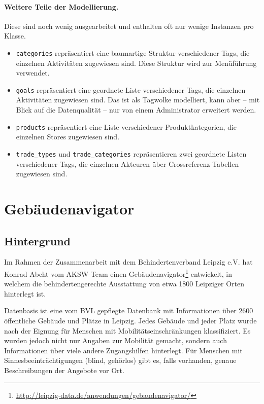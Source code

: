 \documentclass[a4paper,11pt]{article}
\begin{document}
\paragraph{Weitere Teile der Modellierung.}
Diese sind noch wenig ausgearbeitet und enthalten oft nur wenige Instanzen pro
Klasse. 
\begin{itemize}
\item \texttt{categories} repräsentiert eine baumartige Struktur verschiedener
  Tags, die einzelnen Aktivitäten zugewiesen sind.  Diese Struktur wird zur
  Menüführung verwendet. 
\item \texttt{goals} repräsentiert eine geordnete Liste verschiedener Tags, die
  einzelnen Aktivitäten zugewiesen sind. Das ist als Tagwolke modelliert, kann
  aber -- mit Blick auf die Datenqualität -- nur von einem Administrator
  erweitert werden.
\item \texttt{products} repräsentiert eine Liste verschiedener
  Produktkategorien, die einzelnen Stores zugewiesen sind.
\item \texttt{trade\_types} und \texttt{trade\_categories} repräsentieren zwei
  geordnete Listen verschiedener Tags, die einzelnen Akteuren über 
  Crossreferenz-Tabellen zugewiesen sind.
\end{itemize}
\newpage

\section{Gebäudenavigator}

\subsection{Hintergrund}
Im Rahmen der Zusammenarbeit mit dem Behindertenverband Leipzig e.V. hat Konrad
Abcht vom AKSW-Team einen
Gebäudenavigator\footnote{\url{http://leipzig-data.de/anwendungen/gebaudenavigator/}}
entwickelt, in welchem die behindertengerechte Ausstattung von etwa 1800
Leipziger Orten hinterlegt ist.

Datenbasis ist eine vom BVL gepflegte Datenbank mit Informationen über 2600
öffentliche Gebäude und Plätze in Leipzig. Jedes Gebäude und jeder Platz wurde
nach der Eignung für Menschen mit Mobilitätseinschränkungen klassifiziert. Es
wurden jedoch nicht nur Angaben zur Mobilität gemacht, sondern auch
Informationen über viele andere Zugangshilfen hinterlegt. Für Menschen mit
Sinnesbeeinträchtigungen (blind, gehörlos) gibt es, falls vorhanden, genaue
Beschreibungen der Angebote vor Ort.
\end{document}
